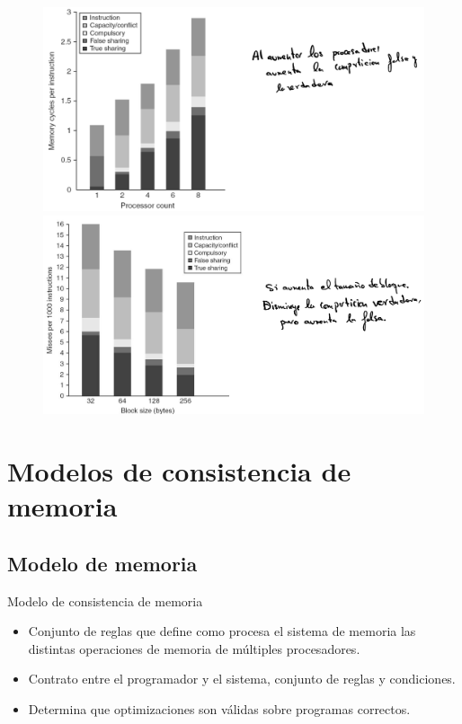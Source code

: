 \documentclass[12pt, twoside, openright]{report} %
\begin{document}
    \begin{figure}[H]
      {\includegraphics[scale=.13]{Untitled 55.png}\includegraphics[scale=.13]{Untitled 56.png}}
    \end{figure}

    
\section{Modelos de consistencia de memoria}


  
\subsection{Modelo de memoria}


    Modelo de consistencia de memoria

    \begin{itemize}
    
    \item
      Conjunto de reglas que define como procesa el sistema de memoria
      las distintas operaciones de memoria de múltiples procesadores.
    \item
      Contrato entre el programador y el sistema, conjunto de reglas y
      condiciones.
    \item
      Determina que optimizaciones son válidas sobre programas
      correctos.
    \end{itemize}
\end{document}
